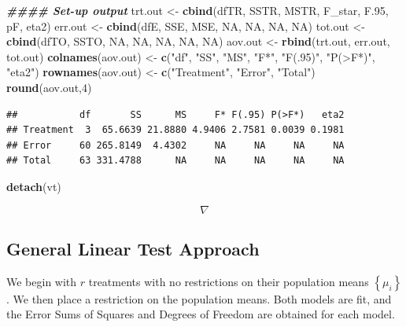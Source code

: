 \documentclass[
]{book}
\newenvironment{Shaded}{\begin{snugshade}}{\end{snugshade}}
\newcommand{\ConstantTok}[1]{\textcolor[rgb]{0.56,0.35,0.01}{#1}}
\newcommand{\DecValTok}[1]{\textcolor[rgb]{0.00,0.00,0.81}{#1}}
\newcommand{\DocumentationTok}[1]{\textcolor[rgb]{0.56,0.35,0.01}{\textbf{\textit{#1}}}}
\newcommand{\FloatTok}[1]{\textcolor[rgb]{0.00,0.00,0.81}{#1}}
\newcommand{\FunctionTok}[1]{\textcolor[rgb]{0.13,0.29,0.53}{\textbf{#1}}}
\newcommand{\NormalTok}[1]{#1}
\newcommand{\OtherTok}[1]{\textcolor[rgb]{0.56,0.35,0.01}{#1}}
\newcommand{\StringTok}[1]{\textcolor[rgb]{0.31,0.60,0.02}{#1}}
\begin{document}
\begin{Shaded}
\begin{Highlighting}[]
\DocumentationTok{\#\#\#\# Set{-}up output}
\NormalTok{trt.out }\OtherTok{\textless{}{-}} \FunctionTok{cbind}\NormalTok{(dfTR, SSTR, MSTR, F\_star, F}\FloatTok{.95}\NormalTok{, pF, eta2)}
\NormalTok{err.out }\OtherTok{\textless{}{-}} \FunctionTok{cbind}\NormalTok{(dfE,  SSE,  MSE,  }\ConstantTok{NA}\NormalTok{,     }\ConstantTok{NA}\NormalTok{,   }\ConstantTok{NA}\NormalTok{, }\ConstantTok{NA}\NormalTok{)}
\NormalTok{tot.out }\OtherTok{\textless{}{-}} \FunctionTok{cbind}\NormalTok{(dfTO, SSTO, }\ConstantTok{NA}\NormalTok{,   }\ConstantTok{NA}\NormalTok{,     }\ConstantTok{NA}\NormalTok{,   }\ConstantTok{NA}\NormalTok{, }\ConstantTok{NA}\NormalTok{)}
\NormalTok{aov.out }\OtherTok{\textless{}{-}} \FunctionTok{rbind}\NormalTok{(trt.out, err.out, tot.out)}
\FunctionTok{colnames}\NormalTok{(aov.out) }\OtherTok{\textless{}{-}} \FunctionTok{c}\NormalTok{(}\StringTok{"df"}\NormalTok{, }\StringTok{"SS"}\NormalTok{, }\StringTok{"MS"}\NormalTok{, }\StringTok{"F*"}\NormalTok{, }\StringTok{"F(.95)"}\NormalTok{, }\StringTok{"P(\textgreater{}F*)"}\NormalTok{, }\StringTok{"eta2"}\NormalTok{)}
\FunctionTok{rownames}\NormalTok{(aov.out) }\OtherTok{\textless{}{-}} \FunctionTok{c}\NormalTok{(}\StringTok{"Treatment"}\NormalTok{, }\StringTok{"Error"}\NormalTok{, }\StringTok{"Total"}\NormalTok{)}
\FunctionTok{round}\NormalTok{(aov.out,}\DecValTok{4}\NormalTok{)}
\end{Highlighting}
\end{Shaded}

\begin{verbatim}
##           df       SS      MS     F* F(.95) P(>F*)   eta2
## Treatment  3  65.6639 21.8880 4.9406 2.7581 0.0039 0.1981
## Error     60 265.8149  4.4302     NA     NA     NA     NA
## Total     63 331.4788      NA     NA     NA     NA     NA
\end{verbatim}

\begin{Shaded}
\begin{Highlighting}[]
\FunctionTok{detach}\NormalTok{(vt)}
\end{Highlighting}
\end{Shaded}

\[\nabla\]

\subsection{General Linear Test
Approach}\label{general-linear-test-approach}

We begin with \(r\) treatments with no restrictions on their population
means \(\left\{\mu_i\right\}\). We then place a restriction on the
population means. Both models are fit, and the Error Sums of Squares and
Degrees of Freedom are obtained for each model.
\end{document}
